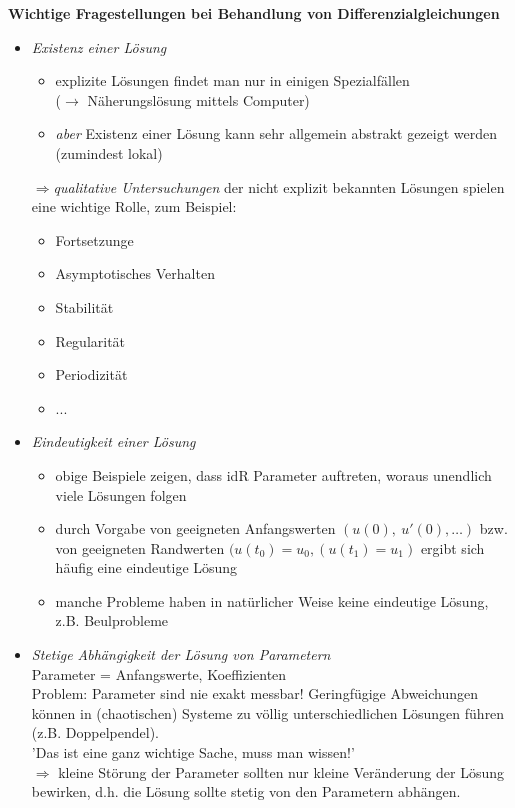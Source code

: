 \newpage
\textbf{Wichtige Fragestellungen bei Behandlung von Differenzialgleichungen}\\
\begin{itemize}
    \item \emph{Existenz einer Lösung}
        \begin{itemize}
            \item explizite Lösungen findet man nur in einigen Spezialfällen\\
                ($\rightarrow $ Näherungslösung mittels Computer)
            \item 
                \emph{aber} Existenz einer Lösung kann 
                sehr allgemein abstrakt gezeigt werden (zumindest lokal)
        \end{itemize}
        $\Rightarrow $\emph{qualitative Untersuchungen} 
        der nicht explizit bekannten Lösungen spielen eine wichtige Rolle,
        zum Beispiel:
        \begin{itemize}
            \item Fortsetzunge
            \item Asymptotisches Verhalten
            \item Stabilität
            \item Regularität
            \item Periodizität
            \item ...
        \end{itemize}
    \item \emph{Eindeutigkeit einer Lösung}
        \begin{itemize}
            \item obige Beispiele zeigen, dass idR Parameter auftreten,
                 woraus unendlich viele Lösungen folgen
            \item durch Vorgabe von geeigneten Anfangswerten $(u(0), \ u'(0), \ldots)$
                bzw. von geeigneten  Randwerten $(u(t_0) = u_0, (u(t_1) = u_1) $ 
                ergibt sich häufig eine  eindeutige Lösung
            \item manche Probleme haben in natürlicher Weise keine eindeutige Lösung,
                z.B. Beulprobleme
        \end{itemize}
    \item \emph{Stetige Abhängigkeit der Lösung von Parametern} \\
        Parameter = Anfangswerte, Koeffizienten\\
        Problem: Parameter sind nie exakt messbar! Geringfügige Abweichungen können
        in (chaotischen) Systeme zu völlig unterschiedlichen Lösungen führen 
        (z.B. Doppelpendel). \\
        'Das ist eine ganz wichtige Sache, muss man wissen!'\\
        $\Rightarrow $ kleine Störung der Parameter sollten nur 
        kleine Veränderung der Lösung bewirken, d.h. die Lösung sollte stetig
        von den Parametern abhängen.
\end{itemize}

